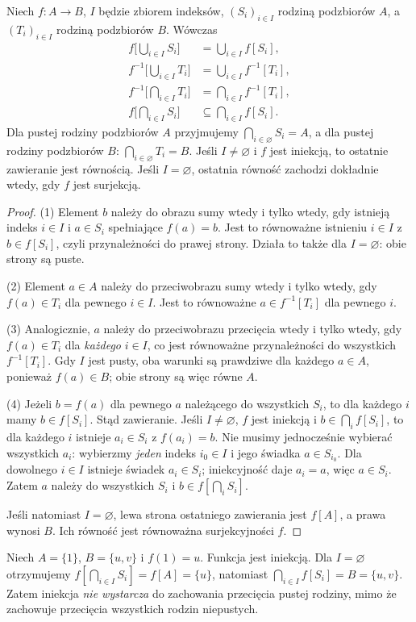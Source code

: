 \begin{twierdzenie}
\label{thm:images-arbitrary-families-xliv}
Niech $f:A\to B$, $I$ będzie zbiorem indeksów,
$(S_i)_{i\in I}$ rodziną podzbiorów $A$, a
$(T_i)_{i\in I}$ rodziną podzbiorów $B$. Wówczas
\begin{align*}
 f\Big[\bigcup_{i\in I}S_i\Big]
   &=\bigcup_{i\in I}f[S_i],\\
 f^{-1}\Big[\bigcup_{i\in I}T_i\Big]
   &=\bigcup_{i\in I}f^{-1}[T_i],\\
 f^{-1}\Big[\bigcap_{i\in I}T_i\Big]
   &=\bigcap_{i\in I}f^{-1}[T_i],\\
 f\Big[\bigcap_{i\in I}S_i\Big]
   &\subseteq\bigcap_{i\in I}f[S_i].
\end{align*}
Dla pustej rodziny podzbiorów $A$ przyjmujemy
$\bigcap_{i\in\varnothing}S_i=A$, a dla pustej rodziny
podzbiorów $B$: $\bigcap_{i\in\varnothing}T_i=B$.
Jeśli $I\ne\varnothing$ i $f$ jest iniekcją, to ostatnie
zawieranie jest równością. Jeśli $I=\varnothing$, ostatnia
równość zachodzi dokładnie wtedy, gdy $f$ jest surjekcją.
\end{twierdzenie}
\begin{proof}
(1) Element $b$ należy do obrazu sumy wtedy i tylko wtedy,
gdy istnieją indeks $i\in I$ i $a\in S_i$ spełniające
$f(a)=b$. Jest to równoważne istnieniu $i\in I$ z
$b\in f[S_i]$, czyli przynależności do prawej strony.
Działa to także dla $I=\varnothing$: obie strony są puste.

(2) Element $a\in A$ należy do przeciwobrazu sumy wtedy
i tylko wtedy, gdy $f(a)\in T_i$ dla pewnego $i\in I$.
Jest to równoważne $a\in f^{-1}[T_i]$ dla pewnego $i$.

(3) Analogicznie, $a$ należy do przeciwobrazu przecięcia
wtedy i tylko wtedy, gdy $f(a)\in T_i$ dla \emph{każdego}
$i\in I$, co jest równoważne przynależności do wszystkich
$f^{-1}[T_i]$. Gdy $I$ jest pusty, oba warunki są
prawdziwe dla każdego $a\in A$, ponieważ $f(a)\in B$;
obie strony są więc równe $A$.

(4) Jeżeli $b=f(a)$ dla pewnego $a$ należącego do
wszystkich $S_i$, to dla każdego $i$ mamy $b\in f[S_i]$.
Stąd zawieranie. Jeśli $I\ne\varnothing$, $f$ jest
iniekcją i $b\in\bigcap_i f[S_i]$, to dla każdego $i$
istnieje $a_i\in S_i$ z $f(a_i)=b$. Nie musimy jednocześnie
wybierać wszystkich $a_i$: wybierzmy \emph{jeden} indeks
$i_0\in I$ i jego świadka $a\in S_{i_0}$. Dla dowolnego
$i\in I$ istnieje świadek $a_i\in S_i$; iniekcyjność
daje $a_i=a$, więc $a\in S_i$. Zatem $a$ należy do
wszystkich $S_i$ i $b\in f[\bigcap_i S_i]$.

Jeśli natomiast $I=\varnothing$, lewa strona ostatniego
zawierania jest $f[A]$, a prawa wynosi $B$. Ich równość
jest równoważna surjekcyjności $f$.
\end{proof}
\begin{przyklad}
Niech $A=\{1\}$, $B=\{u,v\}$ i $f(1)=u$.
Funkcja jest iniekcją. Dla $I=\varnothing$ otrzymujemy
$f[\bigcap_{i\in I}S_i]=f[A]=\{u\}$,
natomiast $\bigcap_{i\in I}f[S_i]=B=\{u,v\}$.
Zatem iniekcja \emph{nie wystarcza} do zachowania przecięcia
pustej rodziny, mimo że zachowuje przecięcia wszystkich
rodzin niepustych.
\end{przyklad}

